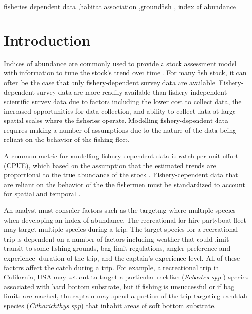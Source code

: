 \documentclass[
  12pt,
  authoryear,
  preprint,
  3p]{elsarticle}
\begin{document}
\begin{frontmatter}
\begin{keyword}
    fisheries dependent data \sep habitat
association \sep groundfish \sep 
    index of abundance
\end{keyword}
\end{frontmatter}\ifdefined\Shaded\renewenvironment{Shaded}{\begin{tcolorbox}[breakable, borderline west={3pt}{0pt}{shadecolor}, enhanced, boxrule=0pt, interior hidden, frame hidden, sharp corners]}{\end{tcolorbox}}\fi

\hypertarget{introduction}{%
\section{Introduction}\label{introduction}}

Indices of abundance are commonly used to provide a stock assessment
model with information to tune the stock's trend over time
\citep{Harley:2001:CUE, Hilborn:1992:QFS}. For many fish stock, it can
often be the case that only fishery-dependent survey data are available.
Fishery-dependent survey data are more readily available than
fishery-independent scientific survey data due to factors including the
lower cost to collect data, the increased opportunities for data
collection, and ability to collect data at large spatial scales where
the fisheries operate. Modelling fishery-dependent data requires making
a number of assumptions due to the nature of the data being reliant on
the behavior of the fishing fleet.

A common metric for modelling fishery-dependent data is catch per unit
effort (CPUE), which based on the assumption that the estimated trends
are proportional to the true abundance of the stock
\citep{Maunder:2004:SCE}. Fishery-dependent data that are reliant on the
behavior of the the fishermen must be standardized to account for
spatial and temporal \citep{Campbell:2004:CSA}.

An analyst must consider factors such as the targeting where multiple
species when developing an index of abundance. The recreational for-hire
partyboat fleet may target multiple species during a trip. The target
species for a recreational trip is dependent on a number of factors
including weather that could limit transit to some fishing grounds, bag
limit regulations, angler preference and experience, duration of the
trip, and the captain's experience level. All of these factors affect
the catch during a trip. For example, a recreational trip in California,
USA may set out to target a particular rockfish (\emph{Sebastes spp.})
species associated with hard bottom substrate, but if fishing is
unsuccessful or if bag limits are reached, the captain may spend a
portion of the trip targeting sanddab species (\emph{Citharichthys spp})
that inhabit areas of soft bottom substrate.
\end{document}
